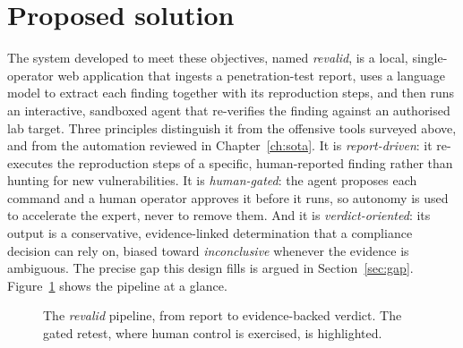 \section{Proposed solution}
\label{sec:solution}

The system developed to meet these objectives, named \emph{revalid}, is a local,
single-operator web application that ingests a penetration-test report, uses a
language model to extract each finding together with its reproduction steps, and
then runs an interactive, sandboxed agent that re-verifies the finding against an
authorised lab target. Three principles distinguish it from the offensive tools
surveyed above, and from the automation reviewed in
Chapter~\ref{ch:sota}. It is \emph{report-driven}: it re-executes the reproduction
steps of a specific, human-reported finding rather than hunting for new
vulnerabilities. It is \emph{human-gated}: the agent proposes each command and a
human operator approves it before it runs, so autonomy is used to accelerate the
expert, never to remove them. And it is \emph{verdict-oriented}: its output is a
conservative, evidence-linked determination that a compliance decision can rely on,
biased toward \emph{inconclusive} whenever the evidence is ambiguous. The precise
gap this design fills is argued in Section~\ref{sec:gap}. Figure~\ref{fig:concept}
shows the pipeline at a glance.

\begin{figure}[htbp]
\centering
{}
\caption[What \emph{revalid} does]{The \emph{revalid} pipeline, from report to evidence-backed verdict. The gated retest, where human control is exercised, is highlighted.}
\label{fig:concept}
\end{figure}

